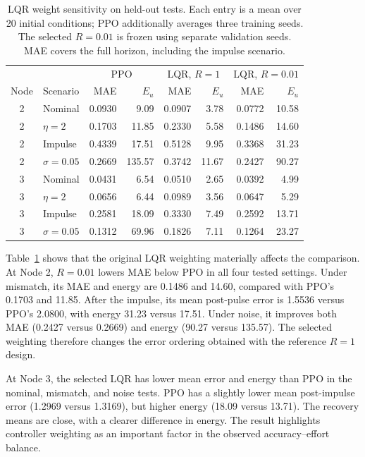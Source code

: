 \documentclass[a4paper,fleqn]{cas-sc}
\theoremstyle{plain}
\theoremstyle{definition}
\begin{document}
\begin{table}[pos=htbp,width=\linewidth]
\centering
\small
\setlength{\tabcolsep}{3pt}
\caption{LQR weight sensitivity on held-out tests. Each entry is a mean over 20 initial conditions; PPO additionally averages three training seeds. The selected $R=0.01$ is frozen using separate validation seeds. MAE covers the full horizon, including the impulse scenario.}
\label{tab:lqr_weight_sensitivity}
\begin{tabular}{@{}clrrrrrr@{}}
\toprule
 & & \multicolumn{2}{c}{PPO} & \multicolumn{2}{c}{LQR, $R=1$} & \multicolumn{2}{c}{LQR, $R=0.01$} \\
Node & Scenario & MAE & $E_u$ & MAE & $E_u$ & MAE & $E_u$ \\
\midrule
2 & Nominal & 0.0930 & 9.09 & 0.0907 & 3.78 & 0.0772 & 10.58 \\
2 & $\eta=2$ & 0.1703 & 11.85 & 0.2330 & 5.58 & 0.1486 & 14.60 \\
2 & Impulse & 0.4339 & 17.51 & 0.5128 & 9.95 & 0.3368 & 31.23 \\
2 & $\sigma=0.05$ & 0.2669 & 135.57 & 0.3742 & 11.67 & 0.2427 & 90.27 \\
\midrule
3 & Nominal & 0.0431 & 6.54 & 0.0510 & 2.65 & 0.0392 & 4.99 \\
3 & $\eta=2$ & 0.0656 & 6.44 & 0.0989 & 3.56 & 0.0647 & 5.29 \\
3 & Impulse & 0.2581 & 18.09 & 0.3330 & 7.49 & 0.2592 & 13.71 \\
3 & $\sigma=0.05$ & 0.1312 & 69.96 & 0.1826 & 7.11 & 0.1264 & 23.27 \\
\bottomrule
\end{tabular}
\end{table}

Table~\ref{tab:lqr_weight_sensitivity} shows that the original LQR weighting materially affects the comparison. At Node 2, $R=0.01$ lowers MAE below PPO in all four tested settings. Under mismatch, its MAE and energy are 0.1486 and 14.60, compared with PPO's 0.1703 and 11.85. After the impulse, its mean post-pulse error is 1.5536 versus PPO's 2.0800, with energy 31.23 versus 17.51. Under noise, it improves both MAE (0.2427 versus 0.2669) and energy (90.27 versus 135.57). The selected weighting therefore changes the error ordering obtained with the reference $R=1$ design.

At Node 3, the selected LQR has lower mean error and energy than PPO in the nominal, mismatch, and noise tests. PPO has a slightly lower mean post-impulse error (1.2969 versus 1.3169), but higher energy (18.09 versus 13.71). The recovery means are close, with a clearer difference in energy. The result highlights controller weighting as an important factor in the observed accuracy--effort balance.
\end{document}
